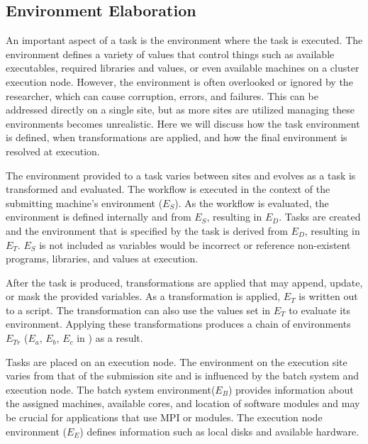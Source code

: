 \documentclass[conference]{IEEEtran}
\begin{document}
\subsection{Environment Elaboration}


An important aspect of a task is the environment
where the task is executed.
The environment defines a variety of values
that control things such as available executables,
required libraries and values,
or even available machines on a cluster execution node.
However, the environment is often overlooked
or ignored by the researcher,
which can cause corruption, errors, and failures.
This can be addressed directly on a single site,
but as more sites are utilized managing these environments
becomes unrealistic.
Here we will discuss how the task environment is defined, 
when transformations are applied, and how the
final environment is resolved at execution.

The environment provided to a task varies between sites
and evolves as a task is transformed and evaluated.
The workflow is executed in the context 
of the submitting machine's environment (${E_S}$). 
As the workflow is evaluated,
the environment is defined internally and from ${E_S}$,
resulting in ${E_D}$.
Tasks are created and 
the environment that is specified by the task 
is derived from ${E_D}$, resulting in ${E_T}$. 
${E_S}$ is not included as variables would be
incorrect or reference non-existent programs, libraries, and values
at execution.

After the task is produced, 
transformations are applied that may 
append, update, or mask the provided variables.
As a transformation is applied, ${E_T}$ is 
written out to a script.
The transformation can also use the values set
in ${E_T}$ to evaluate its environment.
Applying these transformations produces
a chain of environments ${E_{Tr}}$ 
(${E_a}$, ${E_b}$, ${E_c}$ in ) 
as a result. 

Tasks are placed on an execution node. 
The environment on the execution site
varies from that of the submission site 
and is influenced by the batch system and execution node. 
The batch system environment(${E_B}$) provides
information about the assigned machines, available cores, and location of
software modules and may be crucial 
for applications that use MPI or modules. 
The execution node environment (${E_E}$) 
defines information such as 
local disks and available hardware.
\end{document}
